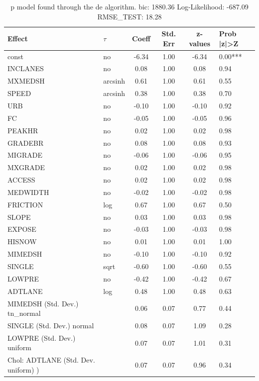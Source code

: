 \begin{table}
	\caption{p model found through the de algorithm. bic: 1880.36 Log-Likelihood: -687.09 RMSE_TEST: 18.28}
	\begin{center}
		\begin{tabular}{|l|l|c|c|c|l|}
			\hline
			Effect & $\tau$ & Coeff & Std. Err & z-values & Prob |z|>Z \\
			\hline
			const & no & -6.34 & 1.00 & -6.34 & 0.00*** \\
			\hline
			INCLANES & no & 0.08 & 1.00 & 0.08 & 0.94 \\
			\hline
			MXMEDSH & arcsinh & 0.61 & 1.00 & 0.61 & 0.55 \\
			\hline
			SPEED & arcsinh & 0.38 & 1.00 & 0.38 & 0.70 \\
			\hline
			URB & no & -0.10 & 1.00 & -0.10 & 0.92 \\
			\hline
			FC & no & -0.05 & 1.00 & -0.05 & 0.96 \\
			\hline
			PEAKHR & no & 0.02 & 1.00 & 0.02 & 0.98 \\
			\hline
			GRADEBR & no & 0.08 & 1.00 & 0.08 & 0.93 \\
			\hline
			MIGRADE & no & -0.06 & 1.00 & -0.06 & 0.95 \\
			\hline
			MXGRADE & no & 0.02 & 1.00 & 0.02 & 0.98 \\
			\hline
			ACCESS & no & 0.02 & 1.00 & 0.02 & 0.98 \\
			\hline
			MEDWIDTH & no & -0.02 & 1.00 & -0.02 & 0.98 \\
			\hline
			FRICTION & log & 0.67 & 1.00 & 0.67 & 0.50 \\
			\hline
			SLOPE & no & 0.03 & 1.00 & 0.03 & 0.98 \\
			\hline
			EXPOSE & no & -0.03 & 1.00 & -0.03 & 0.98 \\
			\hline
			HISNOW & no & 0.01 & 1.00 & 0.01 & 1.00 \\
			\hline
			MIMEDSH & no & -0.10 & 1.00 & -0.10 & 0.92 \\
			\hline
			SINGLE & sqrt & -0.60 & 1.00 & -0.60 & 0.55 \\
			\hline
			LOWPRE & no & -0.42 & 1.00 & -0.42 & 0.67 \\
			\hline
			ADTLANE & log & 0.48 & 1.00 & 0.48 & 0.63 \\
			\hline
			MIMEDSH (Std. Dev.) tn_normal &  & 0.06 & 0.07 & 0.77 & 0.44 \\
			\hline
			SINGLE (Std. Dev.) normal &  & 0.08 & 0.07 & 1.09 & 0.28 \\
			\hline
			LOWPRE (Std. Dev.) uniform &  & 0.07 & 0.07 & 1.01 & 0.31 \\
			\hline
			 Chol: ADTLANE (Std. Dev. uniform) ) &  & 0.07 & 0.07 & 0.96 & 0.34 \\
			\hline
		\end{tabular}
	\end{center}
\end{table}